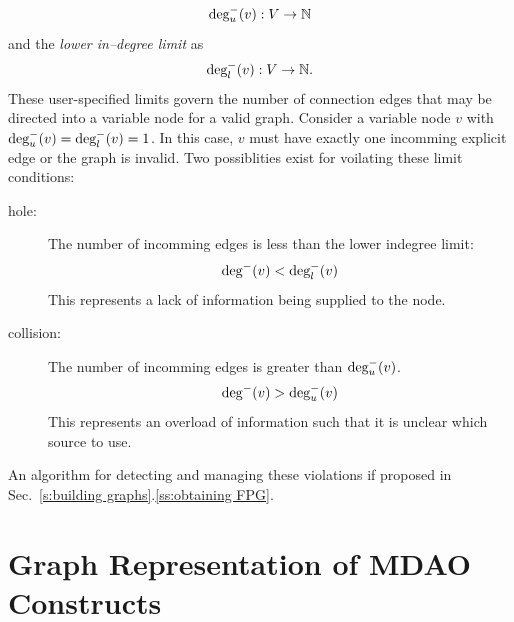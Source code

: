 	\begin{equation}
	\textrm{deg}_u^-(v):V \to \mathbb{N}
	\end{equation} 
	and the \emph{lower in--degree limit} as
	\begin{equation}
	\textrm{deg}_l^-(v):V \to \mathbb{N}.
	\end{equation}
	These user-specified limits govern the number of connection edges that may be directed into a variable
	node for a valid graph. Consider a variable node $v$ with
	$\textrm{deg}_u^-(v) = \textrm{deg}_l^-(v) = 1$. In this case, $v$ must have exactly one
	incomming explicit edge or the graph is invalid. Two possiblities exist for voilating 
	these limit conditions: 
	\begin{description}
	  \item[hole: ] The number of incomming edges is less than the lower indegree limit:
		\begin{equation} \textrm{deg}^-(v) < \textrm{deg}_l^-(v) \label{e:hole} \end{equation}
		This represents a lack of information being supplied to the node.

	  \item[collision: ] The number of incomming edges is greater than $ \textrm{deg}_u^-(v)$. 
		\begin{equation} \textrm{deg}^-(v) > \textrm{deg}_u^-(v) \end{equation}
		This represents an overload of information such that it is unclear which source to use.
	\end{description} 
	An algorithm for detecting and managing these violations if proposed in Sec.~\ref{s:building graphs}.\ref{ss:obtaining FPG}.

\section{Graph Representation of MDAO Constructs}
	\label{s:graph representation}
